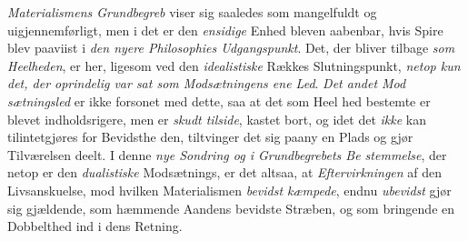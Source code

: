 \emph{Materialismens Grundbegreb} viser sig saaledes som
mangelfuldt og uigjennemførligt, men i det er den \emph{ensidige}
Enhed bleven aabenbar, hvis Spire blev paaviist i \emph{den nyere
Philosophies Udgangspunkt}. Det, der bliver tilbage
\emph{som Heelheden}, er her, ligesom ved den \emph{idealistiske}
Rækkes Slutningspunkt, \emph{netop kun det, der oprindelig
var sat som Modsætningens ene Led}. \emph{Det andet Mod\-%
sætningsled} er ikke forsonet med dette, saa at det som Heel\-%
hed bestemte er blevet indholdsrigere, men er \emph{skudt tilside},
kastet bort, og idet det \emph{ikke} kan tilintetgjøres for Bevidsthe\-%
den, tiltvinger det sig paany en Plads og gjør Tilværelsen
deelt. I denne \emph{nye Sondring og i Grundbegrebets Be\-%
stemmelse}, der netop er den \emph{dualistiske} Modsætnings, er
det altsaa, at \emph{Eftervirkningen} af den Livsanskuelse, mod
hvilken Materialismen \emph{bevidst kæmpede}, endnu \emph{ubevidst}
gjør sig gjældende, som hæmmende Aandens bevidste Stræben,
og som bringende en Dobbelthed ind i dens Retning.

\divrule

